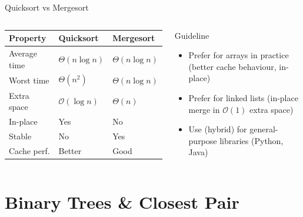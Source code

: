 \documentclass[aspectratio=169]{beamer}
\begin{document}
\begin{frame}[shrink=12]{Quicksort vs Mergesort}
  \begin{columns}[T]
      \begin{tabular}{lll}
        \toprule
        \textbf{Property} & \textbf{Quicksort} & \textbf{Mergesort} \\
        \midrule
        Average time   & $\Theta(n\log n)$ & $\Theta(n\log n)$ \\
        Worst time     & $\Theta(n^2)$ & $\Theta(n\log n)$ \\
        Extra space    & $\mathcal{O}(\log n)$ & $\Theta(n)$ \\
        In-place       & \textcolor{SuccessGreen}{Yes} & \alert{No} \\
        Stable         & \alert{No} & \textcolor{SuccessGreen}{Yes} \\
        Cache perf.    & Better & Good \\
        \bottomrule
      \end{tabular}
      \begin{exampleblock}{Guideline}
        \begin{itemize}
          \item Prefer  for arrays in practice
                (better cache behaviour, in-place)
          \item Prefer  for linked lists
                (in-place merge in $\mathcal{O}(1)$ extra space)
          \item Use  (hybrid) for general-purpose
                libraries (Python, Java)
        \end{itemize}
      \end{exampleblock}
  \end{columns}
\end{frame}

\section{Binary Trees \& Closest Pair}
\end{document}
